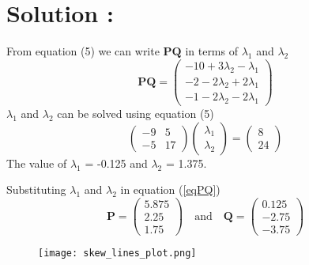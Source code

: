 \documentclass[12pt]{article}
\newcommand{\myvec}[1]{\ensuremath{\begin{pmatrix}#1\end{pmatrix}}} %
\begin{document}
\section*{Solution :}
From equation (5) we can write $\mathbf{PQ}$ in terms of $\lambda_1$ and $\lambda_2$ 
\begin{equation}
	\mathbf{PQ} = \myvec{-10 + 3\lambda_2 -\lambda_1 \\ -2 -2\lambda_2 + 2\lambda_1 \\ -1 -2\lambda_2 - 2\lambda_1}
	\label{eqPQ}
\end{equation}
$\lambda_1$ and $\lambda_2$ can be solved using equation (5)
\begin{equation*}
	\myvec{ -9 & 5 \\ -5 & 17} \myvec{\lambda_1 \\ \lambda_2} = \myvec{8 \\ 24}
\end{equation*}
The value of $\lambda_1$ = -0.125 and $\lambda_2$ = 1.375.

\noindent
Substituting $\lambda_1$ and $\lambda_2$ in equation (\ref{eqPQ})
\begin{equation*}
	\mathbf{P}=\myvec{5.875 \\ 2.25 \\ 1.75} \quad \text{and} \quad \mathbf{Q}=\myvec{0.125 \\ -2.75 \\ -3.75 }
\end{equation*}

\begin{figure}[htbp]
\centering
	\texttt{[image: skew\_lines\_plot.png]}
	\caption{}
\end{figure}
\end{document}
